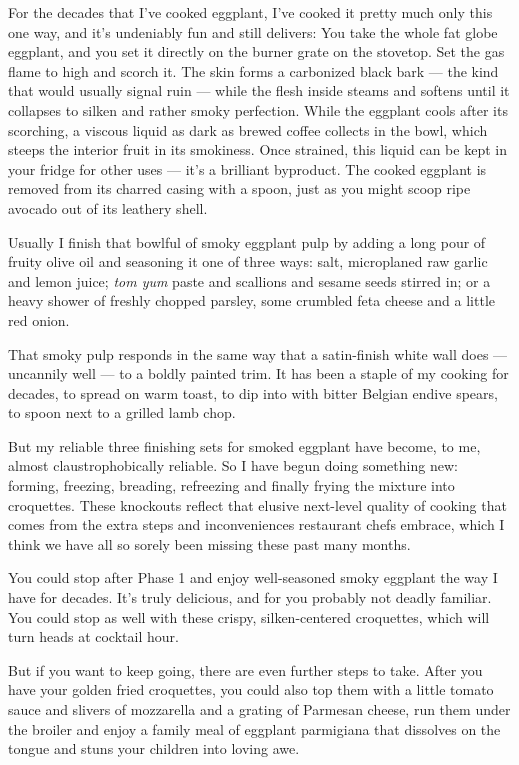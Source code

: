 For the decades that I've cooked eggplant, I've cooked it pretty much
only this one way, and it's undeniably fun and still delivers: You take
the whole fat globe eggplant, and you set it directly on the burner
grate on the stovetop. Set the gas flame to high and scorch it. The skin
forms a carbonized black bark --- the kind that would usually signal
ruin --- while the flesh inside steams and softens until it collapses to
silken and rather smoky perfection. While the eggplant cools after its
scorching, a viscous liquid as dark as brewed coffee collects in the
bowl, which steeps the interior fruit in its smokiness. Once strained,
this liquid can be kept in your fridge for other uses --- it's a
brilliant byproduct. The cooked eggplant is removed from its charred
casing with a spoon, just as you might scoop ripe avocado out of its
leathery shell.

Usually I finish that bowlful of smoky eggplant pulp by adding a long
pour of fruity olive oil and seasoning it one of three ways: salt,
microplaned raw garlic and lemon juice; \emph{tom yum} paste and
scallions and sesame seeds stirred in; or a heavy shower of freshly
chopped parsley, some crumbled feta cheese and a little red onion.

That smoky pulp responds in the same way that a satin-finish white wall
does --- uncannily well --- to a boldly painted trim. It has been a
staple of my cooking for decades, to spread on warm toast, to dip into
with bitter Belgian endive spears, to spoon next to a grilled lamb chop.

But my reliable three finishing sets for smoked eggplant have become, to
me, almost claustrophobically reliable. So I have begun doing something
new: forming, freezing, breading, refreezing and finally frying the
mixture into croquettes. These knockouts reflect that elusive next-level
quality of cooking that comes from the extra steps and inconveniences
restaurant chefs embrace, which I think we have all so sorely been
missing these past many months.

You could stop after Phase 1 and enjoy well-seasoned smoky eggplant the
way I have for decades. It's truly delicious, and for you probably not
deadly familiar. You could stop as well with these crispy,
silken-centered croquettes, which will turn heads at cocktail hour.

But if you want to keep going, there are even further steps to take.
After you have your golden fried croquettes, you could also top them
with a little tomato sauce and slivers of mozzarella and a grating of
Parmesan cheese, run them under the broiler and enjoy a family meal of
eggplant parmigiana that dissolves on the tongue and stuns your children
into loving awe.

